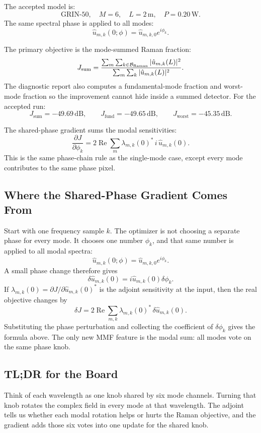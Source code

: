\documentclass[11pt]{article}
\begin{document}
The accepted model is:
\[
    \text{GRIN-50},\quad M=6,\quad L=2\,\mathrm{m},\quad
    P=0.20\,\mathrm{W}.
\]
The same spectral phase is applied to all modes:
\[
    \hat u_{m,k}(0;\phi)=\hat u_{m,k,0}e^{i\phi_k}.
\]

The primary objective is the mode-summed Raman fraction:
\[
    J_{\mathrm{sum}} =
    \frac{\sum_m\sum_{k\in\mathcal{B}_{\mathrm{Raman}}}|\hat u_{m,k}(L)|^2}
         {\sum_m\sum_k|\hat u_{m,k}(L)|^2}.
\]
The diagnostic report also computes a fundamental-mode fraction and worst-mode
fraction so the improvement cannot hide inside a summed detector. For the
accepted run:
\[
    J_{\mathrm{sum}}=-49.69\,\mathrm{dB},\qquad
    J_{\mathrm{fund}}=-49.65\,\mathrm{dB},\qquad
    J_{\mathrm{worst}}=-45.35\,\mathrm{dB}.
\]

The shared-phase gradient sums the modal sensitivities:
\[
    \frac{\partial J}{\partial \phi_k}
    =
    2\operatorname{Re}\sum_m
    \lambda_{m,k}(0)^*\, i\,\hat u_{m,k}(0).
\]
This is the same phase-chain rule as the single-mode case, except every mode
contributes to the same phase pixel.

\subsection*{Where the Shared-Phase Gradient Comes From}

Start with one frequency sample \(k\). The optimizer is not choosing a separate
phase for every mode. It chooses one number \(\phi_k\), and that same number is
applied to all modal spectra:
\[
    \hat u_{m,k}(0;\phi)=\hat u_{m,k,0}e^{i\phi_k}.
\]
A small phase change therefore gives
\[
    \delta \hat u_{m,k}(0)=i\hat u_{m,k}(0)\delta\phi_k.
\]
If \(\lambda_{m,k}(0)=\partial J/\partial \hat u_{m,k}(0)^*\) is the adjoint
sensitivity at the input, then the real objective changes by
\[
    \delta J =
    2\operatorname{Re}\sum_{m,k}
    \lambda_{m,k}(0)^*\,\delta \hat u_{m,k}(0).
\]
Substituting the phase perturbation and collecting the coefficient of
\(\delta\phi_k\) gives the formula above. The only new MMF feature is the modal
sum: all modes vote on the same phase knob.

\subsection*{TL;DR for the Board}

Think of each wavelength as one knob shared by six mode channels. Turning that
knob rotates the complex field in every mode at that wavelength. The adjoint
tells us whether each modal rotation helps or hurts the Raman objective, and
the gradient adds those six votes into one update for the shared knob.
\end{document}
